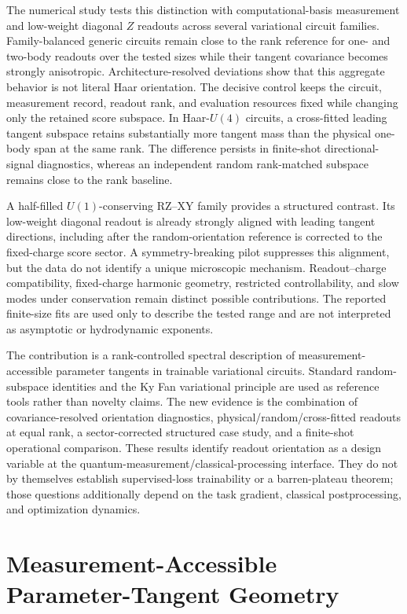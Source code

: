 \documentclass[ASNA,twocolumn]{USG}
\begin{document}
The numerical study tests this distinction with computational-basis measurement and low-weight diagonal $Z$ readouts across several variational circuit families. Family-balanced generic circuits remain close to the rank reference for one- and two-body readouts over the tested sizes while their tangent covariance becomes strongly anisotropic. Architecture-resolved deviations show that this aggregate behavior is not literal Haar orientation. The decisive control keeps the circuit, measurement record, readout rank, and evaluation resources fixed while changing only the retained score subspace. In Haar-$U(4)$ circuits, a cross-fitted leading tangent subspace retains substantially more tangent mass than the physical one-body span at the same rank. The difference persists in finite-shot directional-signal diagnostics, whereas an independent random rank-matched subspace remains close to the rank baseline.

A half-filled $U(1)$-conserving RZ--XY family provides a structured contrast. Its low-weight diagonal readout is already strongly aligned with leading tangent directions, including after the random-orientation reference is corrected to the fixed-charge score sector. A symmetry-breaking pilot suppresses this alignment, but the data do not identify a unique microscopic mechanism. Readout--charge compatibility, fixed-charge harmonic geometry, restricted controllability, and slow modes under conservation remain distinct possible contributions. The reported finite-size fits are used only to describe the tested range and are not interpreted as asymptotic or hydrodynamic exponents.

The contribution is a rank-controlled spectral description of measurement-accessible parameter tangents in trainable variational circuits. Standard random-subspace identities and the Ky Fan variational principle are used as reference tools rather than novelty claims. The new evidence is the combination of covariance-resolved orientation diagnostics, physical/random/cross-fitted readouts at equal rank, a sector-corrected structured case study, and a finite-shot operational comparison. These results identify readout orientation as a design variable at the quantum-measurement/classical-processing interface. They do not by themselves establish supervised-loss trainability or a barren-plateau theorem; those questions additionally depend on the task gradient, classical postprocessing, and optimization dynamics.

\section{Measurement-Accessible Parameter-Tangent Geometry}
\end{document}

